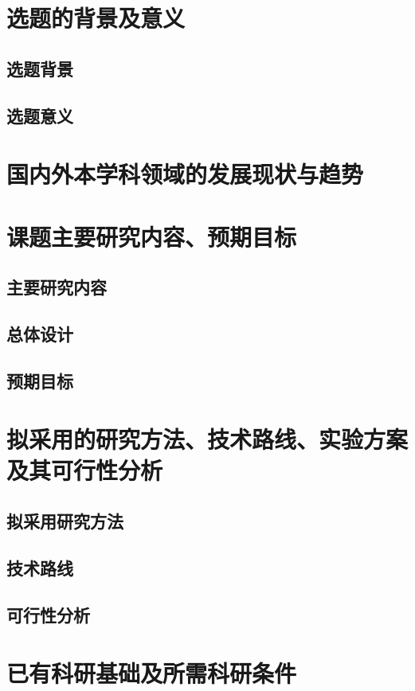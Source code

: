 \documentclass[a4paper,11pt]{article}
\begin{document}
	\newpage
	\thispagestyle{empty}
	\renewcommand{\contentsname}{目~录}
	\setcounter{page}{1}
	\tableofcontents
	
	\newpage
	\section{选题的背景及意义}
		\subsection{选题背景}
		\subsection{选题意义}		
	\section{国内外本学科领域的发展现状与趋势}
	\section{课题主要研究内容、预期目标}
		\subsection{主要研究内容}
		\subsection{总体设计}
		\subsection{预期目标}
	\section{拟采用的研究方法、技术路线、实验方案及其可行性分析}
		\subsection{拟采用研究方法}
		\subsection{技术路线}
		\subsection{可行性分析}
	\section{已有科研基础及所需科研条件}
\end{document}
